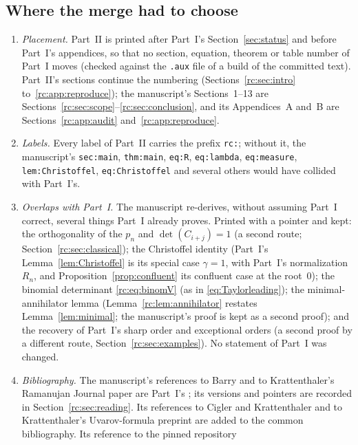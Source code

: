 \documentclass[11pt,a4paper]{article}
\numberwithin{equation}{section}
\theoremstyle{definition}
\theoremstyle{remark}
\begin{document}
\subsection{Where the merge had to choose}\label{rc:sec:merge}
\begin{enumerate}[leftmargin=*,itemsep=2pt]
\item \emph{Placement.}  Part~II is printed after Part~I's
 Section~\ref{sec:status} and before Part~I's appendices, so that no
 section, equation, theorem or table number of Part~I moves (checked
 against the \texttt{.aux} file of a build of the committed text).
 Part~II's sections continue the numbering (Sections~\ref{rc:sec:intro}
 to~\ref{rc:app:reproduce}); the manuscript's Sections~1--13 are
 Sections~\ref{rc:sec:scope}--\ref{rc:sec:conclusion}, and its
 Appendices~A and~B are Sections~\ref{rc:app:audit}
 and~\ref{rc:app:reproduce}.
\item \emph{Labels.}  Every label of Part~II carries the prefix
 \texttt{rc:}; without it, the manuscript's \texttt{sec:main},
 \texttt{thm:main}, \texttt{eq:R}, \texttt{eq:lambda},
 \texttt{eq:measure}, \texttt{lem:Christoffel}, \texttt{eq:Christoffel}
 and several others would have collided with Part~I's.
\item \emph{Overlaps with Part~I.}  The manuscript re-derives, without
 assuming Part~I correct, several things Part~I already proves.  Printed
 with a pointer and kept: the orthogonality of the $p_n$ and
 $\det(C_{i+j})=1$ (a second route; Section~\ref{rc:sec:classical}); the
 Christoffel identity (Part~I's Lemma~\ref{lem:Christoffel} is its
 special case $\gamma=1$, with Part~I's normalization $R_n$, and
 Proposition~\ref{prop:confluent} its confluent case at the root~$0$); the binomial determinant \eqref{rc:eq:binomV}
 (as in \eqref{eq:Taylorleading}); the minimal-annihilator lemma
 (Lemma~\ref{rc:lem:annihilator} restates Lemma~\ref{lem:minimal}; the
 manuscript's proof is kept as a second proof); and the recovery of
 Part~I's sharp order and exceptional orders (a second proof by a
 different route, Section~\ref{rc:sec:examples}).  No statement of Part~I
 was changed.
\item \emph{Bibliography.}  The manuscript's references to Barry and to
 Krattenthaler's Ramanujan Journal paper are Part~I's
 \cite{Barry2020,Krattenthaler2023}; its versions and pointers are
 recorded in Section~\ref{rc:sec:reading}.  Its references to Cigler and
 Krattenthaler and to Krattenthaler's Uvarov-formula preprint are added
 to the common bibliography.  Its reference to the pinned repository

\end{enumerate}
\end{document}
